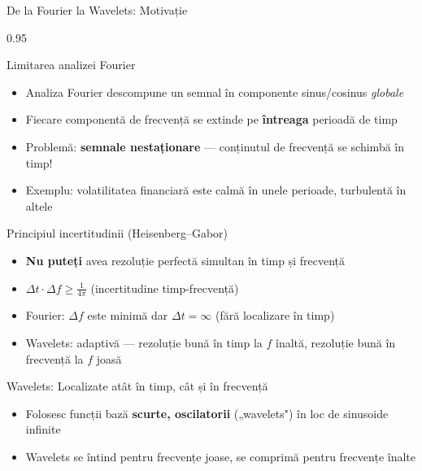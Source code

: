 \documentclass[9pt, aspectratio=169, t]{beamer}
\begin{document}
\begin{frame}{De la Fourier la Wavelets: Motivație}
    \begin{cminipage}{0.95\textwidth}
    \vspace{-2mm}
    \begin{block}{Limitarea analizei Fourier}
        \begin{itemize}\setlength{\itemsep}{0pt}
            \item Analiza Fourier descompune un semnal în componente sinus/cosinus \textit{globale}
            \item Fiecare componentă de frecvență se extinde pe \textbf{întreaga} perioadă de timp
            \item Problemă: \textbf{semnale nestaționare} --- conținutul de frecvență se schimbă în timp!
            \item Exemplu: volatilitatea financiară este calmă în unele perioade, turbulentă în altele
        \end{itemize}
    \end{block}
    \vspace{-2mm}
    \begin{alertblock}{Principiul incertitudinii (Heisenberg--Gabor)}
        \begin{itemize}\setlength{\itemsep}{-2pt}
            \item \textbf{Nu puteți} avea rezoluție perfectă simultan în timp și frecvență
            \item $\Delta t \cdot \Delta f \geq \frac{1}{4\pi}$ (incertitudine timp-frecvență)
            \item Fourier: $\Delta f$ este minimă dar $\Delta t = \infty$ (fără localizare în timp)
            \item Wavelets: adaptivă --- rezoluție bună în timp la $f$ înaltă, rezoluție bună în frecvență la $f$ joasă
        \end{itemize}
    \end{alertblock}
    \vspace{-2mm}
    \begin{exampleblock}{Wavelets: Localizate atât în timp, cât și în frecvență}
        \begin{itemize}\setlength{\itemsep}{-2pt}
            \item Folosesc funcții bază \textbf{scurte, oscilatorii} („wavelets") în loc de sinusoide infinite
            \item Wavelets se întind pentru frecvențe joase, se comprimă pentru frecvențe înalte
        \end{itemize}
    \end{exampleblock}
    \end{cminipage}
\end{frame}
\end{document}
